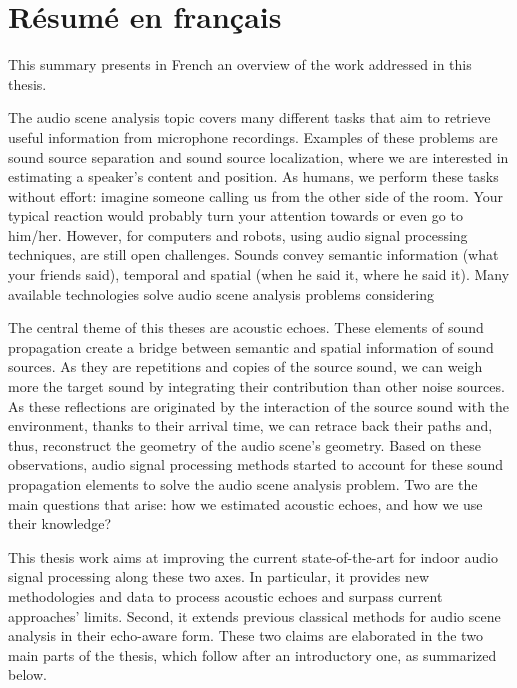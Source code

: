 \chapter*{Résumé en français}

This summary presents in French an overview of the work addressed in this thesis.

The audio scene analysis topic covers many different tasks that aim to retrieve useful information from microphone recordings.
Examples of these problems are sound source separation and sound source localization, where we are interested in estimating a speaker's content and position.
As humans, we perform these tasks without effort: imagine someone calling us from the other side of the room. Your typical reaction would probably turn your attention towards or even go to him/her.
However, for computers and robots, using audio signal processing techniques, are still open challenges.
Sounds convey semantic information (what your friends said), temporal and spatial (when he said it, where he said it).
Many available technologies solve audio scene analysis problems considering

\mynewline
The central theme of this theses are acoustic echoes. These elements of sound propagation create a bridge between semantic and spatial information of sound sources. As they are repetitions and copies of the source sound, we can weigh more the target sound by integrating their contribution than other noise sources.
As these reflections are originated by the interaction of the source sound with the environment, thanks to their arrival time, we can retrace back their paths and, thus, reconstruct the geometry of the audio scene's geometry.
Based on these observations, audio signal processing methods started to account for these sound propagation elements to solve the audio scene analysis problem.
Two are the main questions that arise:
how we estimated acoustic echoes, and how we use their knowledge?

\mynewline
This thesis work aims at improving the current state-of-the-art for indoor audio signal processing along these two axes.
In particular, it provides new methodologies and data to process acoustic echoes and surpass current approaches' limits.
Second, it extends previous classical methods for audio scene analysis in their echo-aware form.
These two claims are elaborated in the two main parts of the thesis, which follow after an introductory one, as summarized below.

